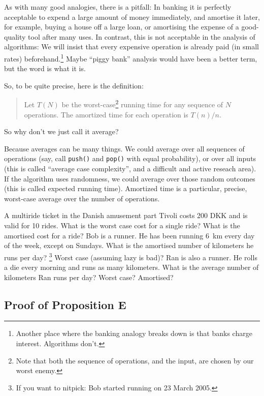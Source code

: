 \documentclass{tufte-handout}
\begin{document}
As with many good analogies, there is a pitfall: 
In banking it is perfectly acceptable to expend a large amount of
money immediately, and amortise it later, for example, buying a house
off a large loan, or amortising the expense of a good-quality tool
after many uses.
In contrast, this is not acceptable in the analysis of algorithms:
We will insist that every expensive operation is already paid (in
small rates) beforehand.\footnote{Another place where the banking
  analogy breaks down is that banks charge interest. Algorithms don't.}
Maybe ``piggy bank'' analysis would have been a better term, but the
word is what it is.

So, to be quite precise, here is the definition:

\begin{quote}
  Let $T(N)$ be the worst-case\footnote{Note that both the sequence of
    operations, and the input, are chosen by our worst enemy.}  running
    time for any sequence of $N$ operations. The amortized time for
    each operation is $T(n)/n$.
\end{quote}


So why don't we just call it average?

Because averages can be many things. We could average over all
sequences of operations (say, call {\tt push()} and {\tt pop()} with
equal probability), or over all inputs (this is called ``average case
complexity'', and a difficult and active reseach area). If the
algorithm uses randomness, we could average over those random outcomes
(this is called expected running time). Amortized time is a
particular, precise, worst-case average over the number of operations.

\begin{ExerciseList}\small
  \Exercise A multiride ticket in the Danish amusement part Tivoli
  costs 200 DKK and is valid for 10 rides. What is the worst case cost
  for a single ride? What is the amortised cost for a ride?  
  \Exercise
  Bob is a runner. 
  He has been running 6~km every day of the week, except on Sundays.
  What is the amortised number of kilometers he runs per day?
  \footnote{If you want to nitpick: Bob started running on 23 March
    2005.}
  Worst case (assuming lazy is bad)?
  \Exercise
  Ran is also a runner.
  He rolls a die every morning and runs as many kilometers.
  What is the average number of kilometers Ran runs per day?
  Worst case? 
  Amortised?
\end{ExerciseList}

\subsection*{Proof of Proposition E}
\end{document}

